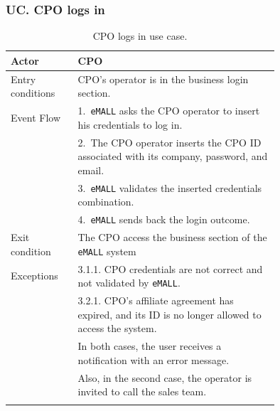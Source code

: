 \subsubsection*{UC\cuc . CPO logs in}
\begin{center}
    \begin{longtable}{lp{0.75\linewidth}}
        \hline
        Actor            & CPO                                                                                                 \\
        \hline
        Entry conditions & CPO’s operator is in the business login section.                                                    \\
        \hline
        Event Flow       & 1.\ \verb|eMALL| asks the CPO operator to insert his credentials to log in.                         \\
        & 2.\ The CPO operator inserts the CPO ID associated with its company, password, and email.           \\
        & 3.\ \verb|eMALL| validates the inserted credentials combination.                                    \\
        & 4.\ \verb|eMALL| sends back the login outcome.                                                      \\
        \hline
        Exit condition   & The CPO access the business section of the \verb|eMALL| system                                      \\
        \hline
        Exceptions       & 3.1.1. CPO credentials are not correct and not validated by \verb|eMALL|.                           \\
        & 3.2.1. CPO’s affiliate agreement has expired, and its ID is no longer allowed to access the system. \\
        & In both cases, the user receives a notification with an error message.                              \\
        & Also, in the second case, the operator is invited to call the sales team.                           \\
        \hline
        \caption{CPO logs in use case.}
        \label{tab: CPO_logs_in_use_case}
    \end{longtable}


\end{center}
